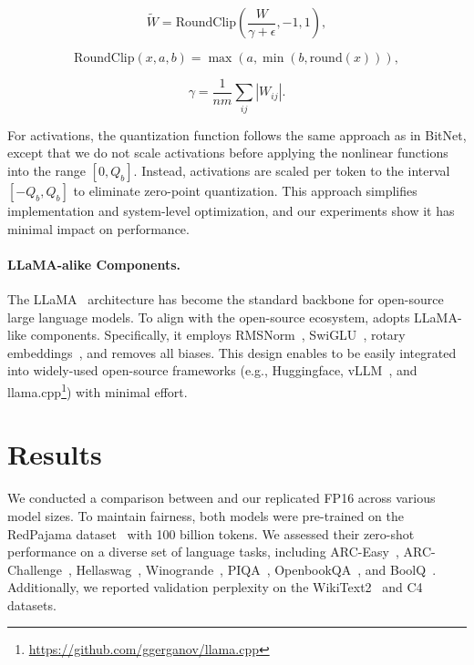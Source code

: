 \begin{equation}
    \widetilde{W} = \mathrm{RoundClip}\left(\frac{W}{\gamma + \epsilon}, -1, 1\right),
\end{equation}

\begin{equation}
    \mathrm{RoundClip}(x, a, b) = \max\left(a, \min\left(b, \mathrm{round}(x)\right)\right),
\end{equation}

\begin{equation}
    \gamma = \frac{1}{nm}\sum_{ij} |W_{ij}|.
\end{equation}

For activations, the quantization function follows the same approach as in BitNet, except that we do not scale activations before applying the nonlinear functions into the range $[0, Q_b]$. Instead, activations are scaled per token to the interval $[-Q_b, Q_b]$ to eliminate zero-point quantization. This approach simplifies implementation and system-level optimization, and our experiments show it has minimal impact on performance.

\paragraph{LLaMA-alike Components.}

The LLaMA~\cite{llama, llama2} architecture has become the standard backbone for open-source large language models. To align with the open-source ecosystem,  adopts LLaMA-like components. Specifically, it employs RMSNorm~\cite{rmsnorm}, SwiGLU~\cite{swiglu}, rotary embeddings~\cite{rope}, and removes all biases. This design enables  to be easily integrated into widely-used open-source frameworks (e.g., Huggingface, vLLM~\cite{vllm}, and llama.cpp\footnote{\url{https://github.com/ggerganov/llama.cpp}}) with minimal effort.

\section{Results}

We conducted a comparison between  and our replicated FP16  across various model sizes. To maintain fairness, both models were pre-trained on the RedPajama dataset~\cite{redpajama} with 100 billion tokens. We assessed their zero-shot performance on a diverse set of language tasks, including ARC-Easy~\cite{arc}, ARC-Challenge~\cite{arc}, Hellaswag~\cite{hellaswag}, Winogrande~\cite{winoGrande}, PIQA~\cite{piqa}, OpenbookQA~\cite{openbookqa}, and BoolQ~\cite{boolq}. Additionally, we reported validation perplexity on the WikiText2~\cite{wikitext2} and C4~\cite{c4} datasets.

